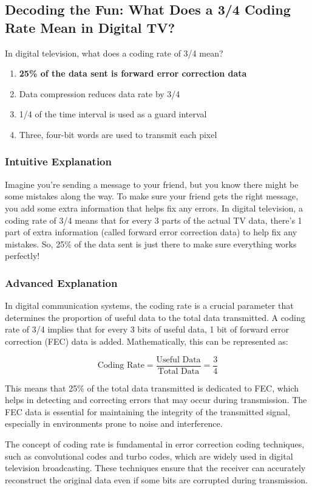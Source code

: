 \subsection{Decoding the Fun: What Does a 3/4 Coding Rate Mean in Digital TV?}

\begin{tcolorbox}[colback=gray!10!white,colframe=black!75!black,title=E2B01] In digital television, what does a coding rate of 3/4 mean?
    \begin{enumerate}[label=\Alph*.]
        \item \textbf{25\% of the data sent is forward error correction data}
        \item Data compression reduces data rate by 3/4
        \item 1/4 of the time interval is used as a guard interval
        \item Three, four-bit words are used to transmit each pixel
    \end{enumerate}
\end{tcolorbox}

\subsubsection{Intuitive Explanation}
Imagine you're sending a message to your friend, but you know there might be some mistakes along the way. To make sure your friend gets the right message, you add some extra information that helps fix any errors. In digital television, a coding rate of 3/4 means that for every 3 parts of the actual TV data, there's 1 part of extra information (called forward error correction data) to help fix any mistakes. So, 25\% of the data sent is just there to make sure everything works perfectly!

\subsubsection{Advanced Explanation}
In digital communication systems, the coding rate is a crucial parameter that determines the proportion of useful data to the total data transmitted. A coding rate of 3/4 implies that for every 3 bits of useful data, 1 bit of forward error correction (FEC) data is added. Mathematically, this can be represented as:

\[
\text{Coding Rate} = \frac{\text{Useful Data}}{\text{Total Data}} = \frac{3}{4}
\]

This means that 25\% of the total data transmitted is dedicated to FEC, which helps in detecting and correcting errors that may occur during transmission. The FEC data is essential for maintaining the integrity of the transmitted signal, especially in environments prone to noise and interference.

The concept of coding rate is fundamental in error correction coding techniques, such as convolutional codes and turbo codes, which are widely used in digital television broadcasting. These techniques ensure that the receiver can accurately reconstruct the original data even if some bits are corrupted during transmission.

